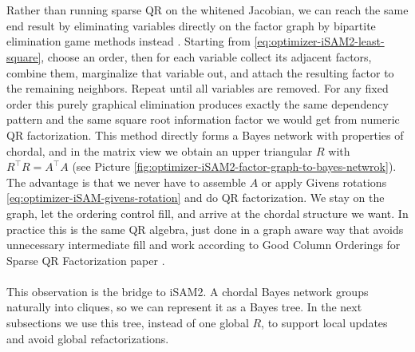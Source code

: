 \\ \\
Rather than running sparse QR on the whitened Jacobian, we can reach the same end result by eliminating variables directly on the factor graph by bipartite elimination game methods instead \cite{QR_factorization}. Starting from \eqref{eq:optimizer-iSAM2-least-square}, choose an order, then for each variable collect its adjacent factors, combine them, marginalize that variable out, and attach the resulting factor to the remaining neighbors. Repeat until all variables are removed. For any fixed order this purely graphical elimination produces exactly the same dependency pattern and the same square root information factor we would get from numeric QR factorization. This method directly forms a Bayes network with properties of chordal, and in the matrix view we obtain an upper triangular $R$ with $R^\top R = A^\top A$ (see Picture \ref{fig:optimizer-iSAM2-factor-graph-to-bayes-netwrok}). The advantage is that we never have to assemble $A$ or apply Givens rotations \eqref{eq:optimizer-iSAM-givens-rotation} and do QR factorization. We stay on the graph, let the ordering control fill, and arrive at the chordal structure we want. In practice this is the same QR algebra, just done in a graph aware way that avoids unnecessary intermediate fill and work according to Good Column Orderings for Sparse QR Factorization paper \cite{QR_factorization}.
\\ \\
This observation is the bridge to \gls{iSAM}2. A chordal Bayes network groups naturally into cliques, so we can represent it as a Bayes tree. In the next subsections we use this tree, instead of one global $R$, to support local updates and avoid global refactorizations.



